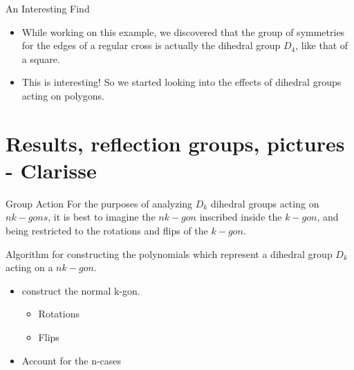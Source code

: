 \documentclass{beamer}
\begin{document}
\begin{frame}{An Interesting Find}
\begin{itemize}
\item While working on this example, we discovered that the group of symmetries for the edges of a regular cross is actually the dihedral group $D_4$, like that of a square.
\item This is interesting! So we started looking into the effects of dihedral groups acting on polygons.
\end{itemize}
\end{frame}



\section{Results, reflection groups, pictures - Clarisse}	
\begin{frame}{Group Action}
For the purposes of analyzing $D_k$ dihedral groups acting on $nk-gons$, it is best to imagine the $nk-gon$ inscribed inside the $k-gon$, and being restricted to the rotations and flips of the $k-gon$.\\
\end{frame}

\begin{frame}{Algorithm for constructing the polynomials  which represent a dihedral group $D_k$ acting on a $nk-gon$.}
	\begin{itemize}
    	\item construct the normal k-gon.
        	\begin{itemize}
            	\item Rotations
                \item Flips
             \end{itemize}
        \item Account for the n-cases
    \end{itemize}
\end{frame}
\end{document}
